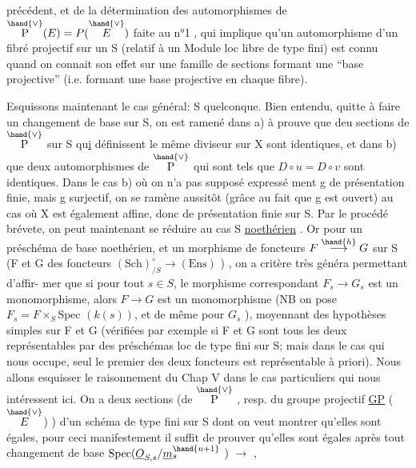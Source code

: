 
précédent, et de la détermination des automorphismes de $\overset{\hand{\vee}}{\mathrm{P}}(E) = P(\overset{\hand{\vee}}{E})$ faite
au n°1 , qui implique qu'un automorphisme d'un fibré projectif sur un S
(relatif à un Module loc libre de type fini)  est connu quand on connait
son effet sur une famille de sections formant une ``base projective''
(i.e. formant une base projective en chaque  fibre).

Esquissons maintenant le cas général: S quelconque.  Bien entendu,
quitte à faire un changement de base sur S, on est ramené dans a) à prouve
que deu sections  de $\overset{\hand{\vee}}{\mathrm{P}}$ sur S  qu\uline{i} définissent le même diviseur sur X sont
identiques, et dans b) que deux automorphismes  de $\overset{\hand{\vee}}{\mathrm{P}}$  qui sont tels que
$D\circ u = D\circ v$  sont identiques.  Dans le cas b) où on n'a pas supposé expressé%
ment  g de présentation finie, mais g surjectif, on se ramène aussitôt
(grâce au fait que g est ouvert) au cas où X est également affine, donc
de présentation finie sur S.  Par le procédé brévete, on peut maintenant
se réduire au cas S \uline{noethérien} .  Or pour un préschéma de base  noethérien,
et un morphisme de foncteurs  $F \overset{\hand{h}}{\longrightarrow} G$ sur S  (F et G des foncteurs
$(\mathrm{Sch})_{/S}^{\circ} \longrightarrow (\mathrm{Ens})$ ) ,  on a  critère très généra  permettant d'affir-%
mer que si  pour tout  $s \in S$, le morphisme correspondant $F_s \longrightarrow G_s$ est
un monomorphisme, alors $F \longrightarrow G$ est un monomorphisme  (NB on pose $F_s{=}F\times_S\mathrm{Spec}$
$(k(s))$, et de même pour $G_s$ ),  moyennant des hypothèses simples sur F et G
(vérifiées par exemple si F et G sont tous les deux représentables par des
préschémas loc de type fini sur S; mais dans le cas qui nous occupe, seul
le premier des deux foncteurs est représentable à priori).  Nous allons
esquisser le raisonnement du Chap V  dans le  cas particuliers qui nous
intéressent ici.  On a deux sections  (de $\overset{\hand{\vee}}{\mathrm{P}}$ , resp. du groupe projectif
\uline{GP} ($\overset{\hand{\vee}}{E}$) ) d'un schéma de type fini  sur S dont on veut montrer qu'elles
sont égales, pour ceci manifestement il suffit de prouver qu'elles sont
égales après tout changement de base  $\mathrm{Spec}(\underline{O}_{S,s}/\underline{m}_s^{\hand{n+1}}$ ) $\longrightarrow$ ,

